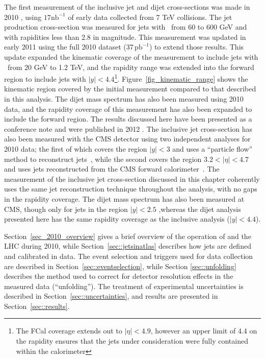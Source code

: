 The first \atlas measurement of the inclusive jet and dijet cross-sections was made in 2010 \cite{InclusivePaperAtlas1,inclusive_confnote_1}, using $17\mathrm{nb}^{-1}$ of early data collected from 7 TeV collisions. The jet production cross-section was measured for jets with \pt~from 60 to 600 GeV and with rapidities less than 2.8 in magnitude. This measurement was updated in early 2011 using the full 2010 \atlas dataset ($37\,\mathrm{pb}^{-1}$) to extend those results. This update expanded the kinematic coverage of the measurement to include jets with \pt~from 20 GeV to 1.2 TeV, and the rapidity range was extended into the forward region to include jets with $|y| < 4.4$\footnote{The FCal coverage extends out to $|\eta| < 4.9$, however an upper limit of 4.4 on the rapidity ensures that the jets under consideration were fully contained within the calorimeter}.   Figure~\ref{fig_kinematic_range} shows the kinematic region covered by the initial measurement compared to that described in this analysis. The dijet mass spectrum has also been measured using 2010 data, and the rapidity coverage of this measurement has also been expanded to include the forward region. The results discussed here have been presented as a conference note \cite{IncJetConf} and were published in 2012 \cite{InclusivePaper2010}. The inclusive jet cross-section has also been measured with the CMS detector using two independent analyses for 2010 data; the first of which covers the region $|y| < 3$ and uses  a ``particle flow'' method to reconstruct jets~\cite{CMSincjet}, while the second covers the region $3.2 < |\eta| < 4.7$ and uses jets reconstructed from the CMS forward calorimeter~\cite{CMSincjetForward}. The \atlas measurement of the inclusive jet cross-section discussed in this chapter coherently uses the same jet reconstruction technique throughout the analysis, with no gaps in the rapidity coverage. The dijet mass spectrum has also been measured at CMS, though only for jets in the region $|y| < 2.5$ \cite{CMS_dijet},whereas the \atlas dijet analysis presented here has the same rapidity coverage as the inclusive analysis ($|y| < 4.4$). 


Section~\ref{sec_2010_overview} gives a brief overview of the operation of \atlas and the LHC during 2010, while Section~\ref{sec::jetsinatlas} describes how jets are defined and calibrated in \atlas data. The event selection and triggers used for data collection are described in Section~\ref{sec::eventselection}, while Section \ref{sec::unfolding} describes the method used to correct for detector resolution effects in the measured data (``unfolding''). The treatment of experimental uncertainties is described in Section~\ref{sec::uncertainties}, and results are presented in Section~\ref{sec::results}. 

